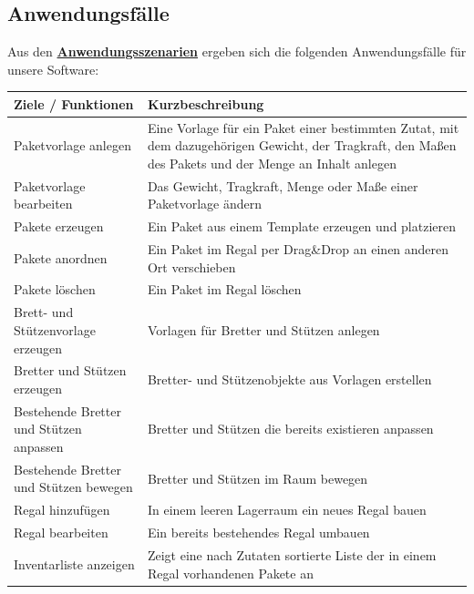 \subsection{Anwendungsfälle}
Aus den \hyperref[subsec:szenarien]{\textbf{Anwendungsszenarien}} ergeben sich die folgenden Anwendungsfälle für unsere Software:
\begin{table}[h!]
    \begin{tabularx}{\textwidth}{l|X}
            \textbf{Ziele / Funktionen} & \textbf{Kurzbeschreibung} \\
            \hline
            Paketvorlage anlegen & Eine Vorlage für ein Paket einer bestimmten Zutat, mit dem dazugehörigen Gewicht, der Tragkraft, den Maßen des Pakets und der Menge an Inhalt anlegen \\
            \hline
            Paketvorlage bearbeiten & Das Gewicht, Tragkraft, Menge oder Maße einer Paketvorlage ändern \\
            \hline
            Pakete erzeugen & Ein Paket aus einem Template erzeugen und platzieren \\
            \hline
            Pakete anordnen & Ein Paket im Regal per Drag\&Drop an einen anderen Ort verschieben \\
            \hline
            Pakete löschen & Ein Paket im Regal löschen \\
            \hline
            Brett- und Stützenvorlage erzeugen & Vorlagen für Bretter und Stützen anlegen \\
            \hline
            Bretter und Stützen erzeugen & Bretter- und Stützenobjekte aus Vorlagen erstellen \\
            \hline
            Bestehende Bretter und Stützen anpassen & Bretter und Stützen die bereits existieren anpassen \\
            \hline
            Bestehende Bretter und Stützen bewegen & Bretter und Stützen im Raum bewegen \\
            \hline
            Regal hinzufügen & In einem leeren Lagerraum ein neues Regal bauen \\
            \hline
            Regal bearbeiten & Ein bereits bestehendes Regal umbauen \\
            \hline
            Inventarliste anzeigen & Zeigt eine nach Zutaten sortierte Liste der in einem Regal vorhandenen Pakete an \\
    \end{tabularx}
\end{table}

